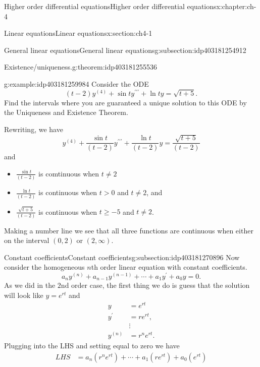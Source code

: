 \documentclass[oneside,10pt,]{book}
\numberwithin{equation}{section}
\numberwithin{equation}{section}
\newcommand{\amp}{&}
\begin{document}
\begin{chapterptx}{Higher order differential equations}{}{Higher order differential equations}{}{}{x:chapter:ch-4}
\begin{sectionptx}{Linear equations}{}{Linear equations}{}{}{x:section:ch4-1}
\begin{subsectionptx}{General linear equations}{}{General linear equations}{}{}{g:subsection:idp403181254912}
\begin{theorem}{Existence\slash{}uniqueness.}{}{g:theorem:idp403181255536}
\end{theorem}
\begin{example}{}{g:example:idp403181259984}%
Consider the ODE%
\begin{equation*}
(t-2)y^{(4)}+\sin ty^{\prime\prime\prime}+\ln ty=\sqrt{t+5}.
\end{equation*}
Find the intervals where you are guaranteed a unique solution to this ODE by the Uniqueness and Existence Theorem.%
\par
Rewriting, we have%
\begin{equation*}
y^{(4)}+\frac{\sin t}{(t-2)}y^{\prime\prime\prime}+\frac{\ln t}{(t-2)}y=\frac{\sqrt{t+5}}{(t-2)}
\end{equation*}
and%
\begin{itemize}[label=\textbullet]
\item{}\(\frac{\sin t}{(t-2)}\) is comtinuous when \(t\neq2\)%
\item{}\(\frac{\ln t}{(t-2)}\) is continuous when \(t>0\) and \(t\neq2\), and%
\item{}\(\frac{\sqrt{t+5}}{(t-2)}\) is continuous when \(t\geq-5\) and \(t\neq2\).%
\end{itemize}
Making a number line we see that all three functions are continuous when either on the interval \((0,2)\) or \((2,\infty)\).%
\end{example}
\end{subsectionptx}
%
%
\typeout{************************************************}
\typeout{************************************************}
%
\begin{subsectionptx}{Constant coefficients}{}{Constant coefficients}{}{}{g:subsection:idp403181270896}
Now consider the homogeneous \(n\)th order linear equation with constant coefficients.%
\begin{equation*}
a_{n}y^{(n)}+a_{n-1}y^{(n-1)}+\cdots+a_{1}y^{\prime}+a_{0}y=0.
\end{equation*}
As we did in the \(2\)nd order case, the first thing we do is guess that the solution will look like \(y=e^{rt}\) and%
\begin{align*}
y \amp =e^{rt}\\
y^{\prime} \amp =re^{rt},\\
\amp \vdots\\
y^{(n)} \amp =r^{n}e^{rt}.
\end{align*}
Plugging into the LHS and setting equal to zero we have%
\begin{align*}
LHS \amp =a_{n}\left(r^{n}e^{rt}\right)+\cdots+a_{1}\left(re^{rt}\right)+a_{0}\left(e^{rt}\right)\\

\end{align*}
\end{subsectionptx}
\end{sectionptx}
\end{chapterptx}
\end{document}
